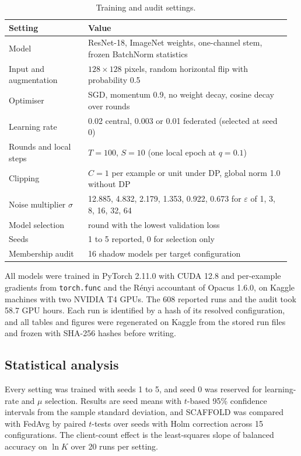 \documentclass[preprint,12pt]{elsarticle}
\begin{document}
\begin{table}[htbp]
\caption{Training and audit settings.}\label{tab:setup}
\footnotesize
\begin{tabular*}{\linewidth}{@{}p{0.27\linewidth}p{0.69\linewidth}@{}}
\toprule
Setting & Value\\
\midrule
Model & ResNet-18, ImageNet weights, one-channel stem, frozen BatchNorm statistics\\
Input and augmentation & $128\times128$ pixels, random horizontal flip with probability 0.5\\
Optimiser & SGD, momentum 0.9, no weight decay, cosine decay over rounds\\
Learning rate & 0.02 central, 0.003 or 0.01 federated (selected at seed 0)\\
Rounds and local steps & $T=100$, $S=10$ (one local epoch at $q=0.1$)\\
Clipping & $C=1$ per example or unit under DP, global norm 1.0 without DP\\
Noise multiplier $\sigma$ & 12.885, 4.832, 2.179, 1.353, 0.922, 0.673 for $\varepsilon$ of 1, 3, 8, 16, 32, 64\\
Model selection & round with the lowest validation loss\\
Seeds & 1 to 5 reported, 0 for selection only\\
Membership audit & 16 shadow models per target configuration\\
\bottomrule
\end{tabular*}
\end{table}

All models were trained in PyTorch 2.11.0 with CUDA 12.8 and per-example gradients from
\texttt{torch.func} and the R\'enyi accountant of Opacus 1.6.0, on Kaggle machines with two NVIDIA T4 GPUs. The 608
reported runs and the audit took 58.7 GPU hours. Each run is identified by a hash of its resolved
configuration, and all tables and figures were regenerated on Kaggle from the stored run files and frozen with SHA-256
hashes before writing.

\subsection{Statistical analysis}
Every setting was trained with seeds 1 to 5, and seed 0 was reserved for learning-rate and $\mu$ selection. Results
are seed means with $t$-based 95\% confidence intervals from the sample standard deviation, and SCAFFOLD was compared
with FedAvg by paired $t$-tests over seeds with Holm correction across 15 configurations. The client-count effect is
the least-squares slope of balanced accuracy on $\ln K$ over 20 runs per setting.
\end{document}

